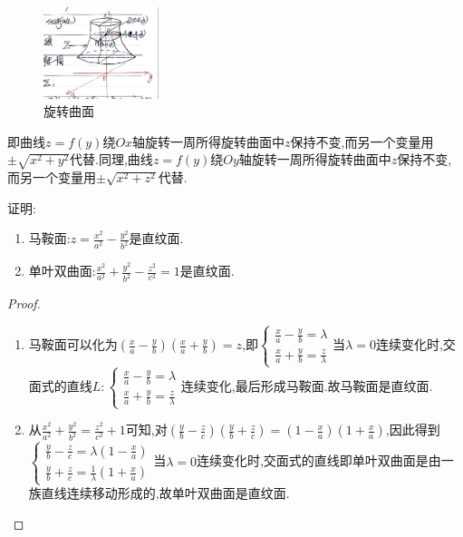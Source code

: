 \begin{figure}[htbp]
    \centering
    \includegraphics[width=0.3\textwidth]{figure/4-9.png}
    \caption{旋转曲面}
    \label{fig:旋转曲面}
\end{figure}

即曲线$z = f(y)$绕$Ox$轴旋转一周所得旋转曲面中$z$保持不变,而另一个变量用$\pm \sqrt{x^2 + y^2}$代替.同理,曲线$z = f(y)$绕$Oy$轴旋转一周所得旋转曲面中$z$保持不变,而另一个变量用$\pm \sqrt{x^2 + z^2}$代替.

\begin{example}
    证明:
    \begin{enumerate}
        \item 马鞍面:$z = \frac{x^2}{a^2} - \frac{y^2}{b^2}$是直纹面.
        \item 单叶双曲面:$\frac{x^2}{a^2} + \frac{y^2}{b^2} - \frac{z^2}{c^2} = 1$是直纹面.
    \end{enumerate}
\end{example}

\begin{proof}
    

    \begin{enumerate}
        \item 马鞍面可以化为$\left( \frac{x}{a} - \frac{y}{b} \right) \left( \frac{x}{a} + \frac{y}{b} \right) = z$,即$\begin{cases}
        \frac{x}{a} - \frac{y}{b} = \lambda\\
        \frac{x}{a} + \frac{y}{b} = \frac{z}{\lambda}
    \end{cases}$当$\lambda = 0$连续变化时,交面式的直线$L:\begin{cases}
        \frac{x}{a} - \frac{y}{b} = \lambda \\
        \frac{x}{a} + \frac{y}{b} = \frac{z}{\lambda}
    \end{cases}$连续变化,最后形成马鞍面.故马鞍面是直纹面.
        \item 从$\frac{x^2}{a^2} + \frac{y^2}{b^2} = \frac{z^2}{c^2} + 1$可知,对$\left( \frac{y}{b} - \frac{z}{c} \right) \left( \frac{y}{b} + \frac{z}{c} \right) = \left( 1 - \frac{x}{a} \right) \left( 1 + \frac{x}{a} \right)$,因此得到$\begin{cases}
        \frac{y}{b} - \frac{z}{c} = \lambda \left(1 - \frac{x}{a} \right)\\
        \frac{y}{b} + \frac{z}{c} = \frac{1}{\lambda} \left( 1 + \frac{x}{a} \right)
        \end{cases}$当$\lambda = 0$连续变化时,交面式的直线即单叶双曲面是由一族直线连续移动形成的,故单叶双曲面是直纹面.
    \end{enumerate}
\end{proof}



